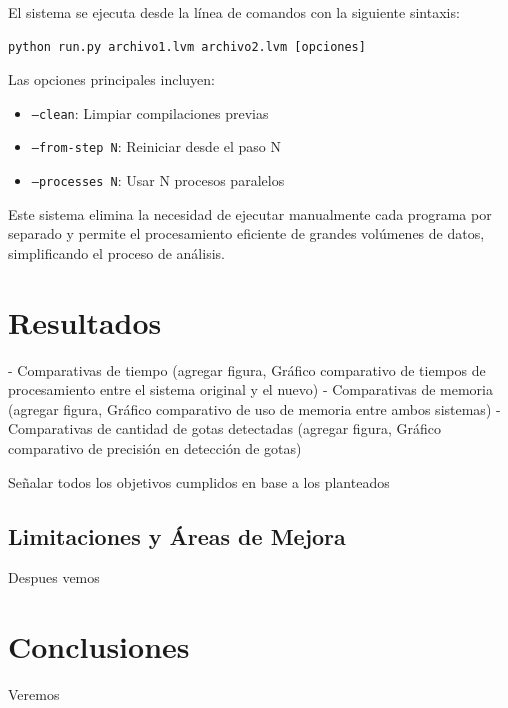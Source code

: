 \documentclass[12pt,a4paper]{article}
\begin{document}
El sistema se ejecuta desde la línea de comandos con la siguiente sintaxis:

\begin{verbatim}
python run.py archivo1.lvm archivo2.lvm [opciones]
\end{verbatim}

Las opciones principales incluyen:
\begin{itemize}
    \item \texttt{--clean}: Limpiar compilaciones previas
    \item \texttt{--from-step N}: Reiniciar desde el paso N
    \item \texttt{--processes N}: Usar N procesos paralelos
\end{itemize}

Este sistema elimina la necesidad de ejecutar manualmente cada programa por separado y permite el procesamiento eficiente de grandes volúmenes de datos, simplificando el proceso de análisis.

\section{Resultados}

- Comparativas de tiempo (agregar figura, {Gráfico comparativo de tiempos de procesamiento entre el sistema original y el nuevo})
- Comparativas de memoria (agregar figura, {Gráfico comparativo de uso de memoria entre ambos sistemas})
- Comparativas de cantidad de gotas detectadas (agregar figura, {Gráfico comparativo de precisión en detección de gotas})

Señalar todos los objetivos cumplidos en base a los planteados

\subsection{Limitaciones y Áreas de Mejora}
\lhead{}

Despues vemos

\section{Conclusiones}

Veremos 

\printbibliography
\end{document}

